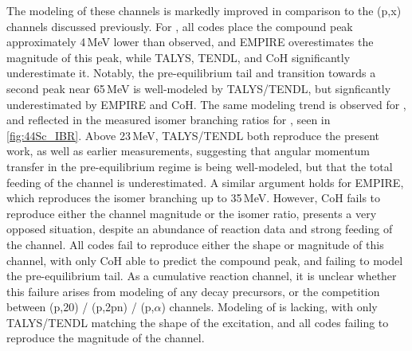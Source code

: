 The modeling of these channels is markedly improved  in comparison to the (p,x) channels discussed previously.
For , 
all  codes place the compound peak approximately 4\,MeV lower than observed, and EMPIRE overestimates the magnitude of this peak, while TALYS, TENDL, and CoH significantly underestimate it.
Notably, the pre-equilibrium tail and transition towards a second peak near 65\,MeV is well-modeled by TALYS/TENDL, but signficantly underestimated by EMPIRE and CoH.
The same modeling trend is observed for , 
and reflected in the measured isomer branching ratios for , seen in \autoref{fig:44Sc_IBR}.
Above 23\,MeV, TALYS/TENDL both reproduce the present work, as well as earlier measurements, suggesting that angular momentum transfer in the pre-equilibrium regime is being well-modeled, but that the total feeding of the  channel is  underestimated. 
A similar argument holds for EMPIRE, which reproduces the isomer branching  up to 35\,MeV.
However, CoH fails to reproduce either the channel magnitude or the isomer ratio,
 presents a very opposed situation, despite an abundance of reaction data and strong feeding of the channel.
All codes fail to reproduce either the shape or magnitude of this channel, with only CoH able to predict the compound peak,  and failing to model the pre-equilibrium tail.
As a cumulative reaction channel, it is unclear whether this failure arises from modeling of any  decay precursors, or the competition between  (p,20) / (p,2pn) / (p,$\alpha$) channels. 
Modeling of  is lacking, with only TALYS/TENDL matching the shape of the excitation, and all codes failing to reproduce the magnitude of the channel.




